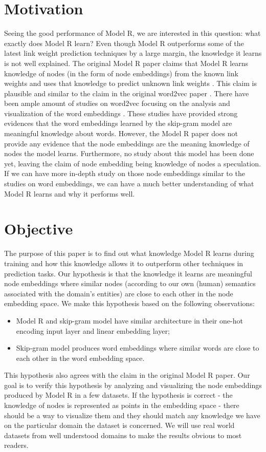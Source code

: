 \documentclass[conference]{IEEEtran}
\begin{document}
\section{Motivation}
Seeing the good performance of Model R, we are interested in this question: what exactly does Model R learn?
Even though Model R outperforms some of the latest link weight prediction techniques by a large margin, the knowledge it learns is not well explained.
The original Model R paper claims that Model R learns knowledge of nodes (in the form of node embeddings) from the known link weights and uses that knowledge to predict unknown link weights \cite{hou2017deep}.
This claim is plausible and similar to the claim in the original word2vec paper \cite{mikolov2013linguistic}.
There have been ample amount of studies on word2vec focusing on the analysis and visualization of the word embeddings \cite{mikolov2013distributed} \cite{mikolov2013linguistic}.
These studies have provided strong evidences that the word embeddings learned by the skip-gram model are meaningful knowledge about words.
However, the Model R paper does not provide any evidence that the node embeddings are the meaning knowledge of nodes the model learns.
Furthermore, no study about this model has been done yet, leaving the claim of node embedding being knowledge of nodes a speculation.
If we can have more in-depth study on those node embeddings similar to the studies on word embeddings, we can have a much better understanding of what Model R learns and why it performs well.

\section{Objective}
The purpose of this paper is to find out what knowledge Model R learns during training and how this knowledge allows it to outperform other techniques in prediction tasks.
Our hypothesis is that the knowledge it learns are meaningful node embeddings where similar nodes (according to our own (human) semantics associated with the domain's entities) are close to each other in the node embedding space.
We make this hypothesis based on the following observations:
\begin{itemize}
	\item Model R and skip-gram model have similar architecture in their one-hot encoding input layer and linear embedding layer;
	\item Skip-gram model produces word embeddings where similar words are close to each other in the word embedding space.
\end{itemize}
This hypothesis also agrees with the claim in the original Model R paper.
Our goal is to verify this hypothesis by analyzing and visualizing the node embeddings produced by Model R in a few datasets.
If the hypothesis is correct - the knowledge of nodes is represented as points in the embedding space - there should be a way to visualize them and they should match any knowledge we have on the particular domain the dataset is concerned.
We will use real world datasets from well understood domains to make the results obvious to most readers.
\end{document}
